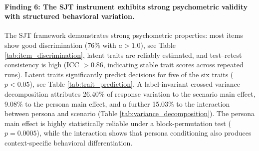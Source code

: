 \documentclass[11pt]{article}
\begin{document}
\paragraph{Finding 6: The SJT instrument exhibits strong psychometric validity with structured behavioral variation.}
The SJT framework demonstrates strong psychometric properties: most items show good discrimination (76\% with $a > 1.0$), see Table \ref{tab:item_discrimination}, latent traits are reliably estimated, and test--retest consistency is high (ICC $> 0.86$, indicating stable trait scores across repeated runs). Latent traits significantly predict decisions for five of the six traits ($p < 0.05$), see Table \ref{tab:trait_prediction}. A label-invariant crossed variance decomposition attributes 26.40\% of response variation to the scenario main effect, 9.08\% to the persona main effect, and a further 15.03\% to the interaction between persona and scenario (Table \ref{tab:variance_decomposition}). The persona main effect is highly statistically reliable under a block-permutation test ($p = 0.0005$), while the interaction shows that persona conditioning also produces context-specific behavioral differentiation.



\end{document}
